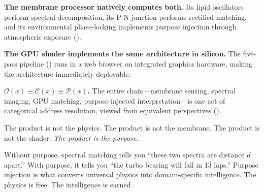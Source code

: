 \documentclass[11pt,twocolumn,a4paper]{article}
\theoremstyle{definition}
\theoremstyle{remark}
\newcommand{\Obs}{\mathcal{O}}
\newcommand{\Comp}{\mathcal{C}}
\newcommand{\Proc}{\mathcal{P}}
\begin{document}
\textbf{The membrane processor natively computes both.}  Its lipid oscillators perform spectral decomposition, its P-N junction performs rectified matching, and its environmental phase-locking implements purpose injection through atmospheric exposure ().

\textbf{The GPU shader implements the same architecture in silicon.}  The five-pass pipeline () runs in a web browser on integrated graphics hardware, making the architecture immediately deployable.

\textbf{$\Obs(x) \equiv \Comp(x) \equiv \Proc(x)$.}  The entire chain---membrane sensing, spectral imaging, GPU matching, purpose-injected interpretation---is one act of categorical address resolution, viewed from equivalent perspectives ().

The product is not the physics.  The product is not the membrane.  The product is not the shader.  \emph{The product is the purpose.}

Without purpose, spectral matching tells you ``these two spectra are distance $d$ apart.''  With purpose, it tells you ``the turbo bearing will fail in 13 laps.''  Purpose injection is what converts universal physics into domain-specific intelligence.  The physics is free.  The intelligence is earned.

\vspace{1cm}


\end{document}
